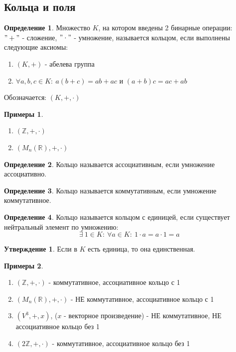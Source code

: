 \documentclass[a4paper, 12pt]{article}
\newcommand{\R}{\mathbb R}
\newcommand{\Z}{\mathbb Z}
\newcommand\tab[1][.5cm]{\hspace*{#1}}
\theoremstyle{definition}
\newtheorem*{definition}{Определение}
\newtheorem*{subtheorem}{Утверждение}
\newtheorem*{example}{Примеры}
\begin{document}
  \subsection{Кольца и поля}
  \begin{definition}
    Множество $K$, на котором введены 2 бинарные операции:\\ $"+"$ - сложение, $"\cdot"$ - умножение, называется кольцом, если выполнены следующие аксиомы:
    \begin{enumerate}
      \item $(K, +)$ - абелева группа
      \item $\forall a,b,c \in K: \ a(b+c) = ab+ac$ и $(a+b)c = ac+ab$   
    \end{enumerate}
    Обозначается: $(K, +, \cdot)$
  \end{definition} 
  \begin{example}\tab
    \begin{enumerate}
      \item $(\Z, +, \cdot)$
      \item $(M_n(\R), +, \cdot)$
    \end{enumerate}
  \end{example}
  \begin{definition}
    Кольцо называется ассоциативным, если умножение ассоциативно.
  \end{definition}
  \begin{definition}
    Кольцо называется коммутативным, если умножение коммутативное.
  \end{definition}
  \begin{definition}
    Кольцо называется кольцом с единицей, если существует нейтральный элемент по умножению:
    $$\exists \ 1 \in K: \ \forall a\in K: \ 1 \cdot a = a \cdot 1 = a$$ 
  \end{definition}
  \begin{subtheorem}
    Если в $K$ есть единица, то она единственная. 
  \end{subtheorem} 
  \begin{example} \tab
    \begin{enumerate}
      \item $(\Z, +, \cdot)$ - коммутативное, ассоциативное кольцо с 1
      \item $(M_n(\R), +, \cdot)$ - НЕ коммутативное, ассоциативное кольцо с 1
      \item $(V^3,+, x)$, ($x$ - векторное произведение) - НЕ коммутативное, НЕ ассоциативное кольцо без 1
      \item $(2\Z, +, \cdot)$ -  коммутативное, ассоциативное кольцо без 1
    \end{enumerate}
  \end{example}
\end{document}
